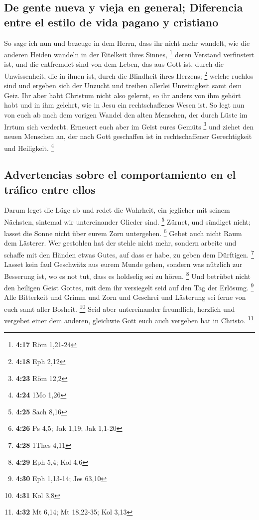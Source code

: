 \hypertarget{de-gente-nueva-y-vieja-en-general-diferencia-entre-el-estilo-de-vida-pagano-y-cristiano}{%
\subsection{De gente nueva y vieja en general; Diferencia entre el
estilo de vida pagano y
cristiano}\label{de-gente-nueva-y-vieja-en-general-diferencia-entre-el-estilo-de-vida-pagano-y-cristiano}}

 So sage ich nun und bezeuge in dem Herrn, dass ihr nicht
mehr wandelt, wie die anderen Heiden wandeln in der Eitelkeit ihres
Sinnes, \footnote{\textbf{4:17} Röm 1,21-24}  deren
Verstand verfinstert ist, und die entfremdet sind von dem Leben, das aus
Gott ist, durch die Unwissenheit, die in ihnen ist, durch die Blindheit
ihres Herzens; \footnote{\textbf{4:18} Eph 2,12}  welche
ruchlos sind und ergeben sich der Unzucht und treiben allerlei
Unreinigkeit samt dem Geiz.  Ihr aber habt Christum nicht
also gelernt,  so ihr anders von ihm gehört habt und in
ihm gelehrt, wie in Jesu ein rechtschaffenes Wesen ist. 
So legt nun von euch ab nach dem vorigen Wandel den alten Menschen, der
durch Lüste im Irrtum sich verderbt.  Erneuert euch aber
im Geist eures Gemüts \footnote{\textbf{4:23} Röm 12,2} 
und ziehet den neuen Menschen an, der nach Gott geschaffen ist in
rechtschaffener Gerechtigkeit und Heiligkeit. \footnote{\textbf{4:24}
  1Mo 1,26}

\hypertarget{advertencias-sobre-el-comportamiento-en-el-truxe1fico-entre-ellos}{%
\subsection{Advertencias sobre el comportamiento en el tráfico entre
ellos}\label{advertencias-sobre-el-comportamiento-en-el-truxe1fico-entre-ellos}}

 Darum leget die Lüge ab und redet die Wahrheit, ein
jeglicher mit seinem Nächsten, sintemal wir untereinander Glieder sind.
\footnote{\textbf{4:25} Sach 8,16}  Zürnet, und sündiget
nicht; lasset die Sonne nicht über eurem Zorn untergehen. \footnote{\textbf{4:26}
  Ps 4,5; Jak 1,19; Jak 1,1-20}  Gebet auch nicht Raum
dem Lästerer.  Wer gestohlen hat der stehle nicht mehr,
sondern arbeite und schaffe mit den Händen etwas Gutes, auf dass er
habe, zu geben dem Dürftigen. \footnote{\textbf{4:28} 1Thes 4,11}
 Lasset kein faul Geschwätz aus eurem Munde gehen,
sondern was nützlich zur Besserung ist, wo es not tut, dass es holdselig
sei zu hören. \footnote{\textbf{4:29} Eph 5,4; Kol 4,6} 
Und betrübet nicht den heiligen Geist Gottes, mit dem ihr versiegelt
seid auf den Tag der Erlösung. \footnote{\textbf{4:30} Eph 1,13-14; Jes
  63,10}  Alle Bitterkeit und Grimm und Zorn und Geschrei
und Lästerung sei ferne von euch samt aller Bosheit. \footnote{\textbf{4:31}
  Kol 3,8}  Seid aber untereinander freundlich, herzlich
und vergebet einer dem anderen, gleichwie Gott euch auch vergeben hat in
Christo. \footnote{\textbf{4:32} Mt 6,14; Mt 18,22-35; Kol 3,13}

